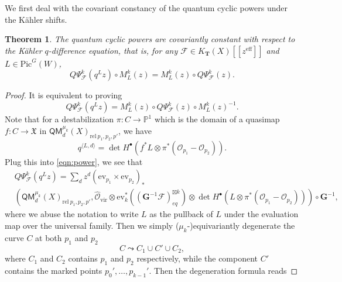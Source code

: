 \documentclass[reqno]{amsart}
\numberwithin{equation}{section}
\numberwithin{equation}{section}
\numberwithin{equation}{section}
\newtheorem{thm}{Theorem}[section]
\theoremstyle{definition}
\theoremstyle{remark}
\theoremstyle{remark}
\newcommand{\curly}{\mathrel{\leadsto}}
\begin{document}
We first deal with the covariant constancy of the quantum cyclic powers under the K\"ahler shifts.
\begin{thm}\label{thm:kahler-covariant-constancy}
    The quantum cyclic powers are covariantly constant with respect to the K\"ahler $q$-difference equation, that is, for any $\mathcal{F} \in K_{\mathbf{T}}(X)[\![ z^{\mathrm{eff}} ]\!]$ and $L \in \mathrm{Pic}^G(W)$,
    \begin{equation}
        Q\Psi^k_{\mathcal{F}}(q^L z) \circ M_L^k(z) = M^k_L(z) \circ Q\Psi^k_{\mathcal{F}}(z).
    \end{equation}
\end{thm}
\begin{proof}
    It is equivalent to proving
    \begin{equation}
        Q\Psi^k_{\mathcal{F}}(q^L z) = M^k_L(z) \circ Q\Psi^k_{\mathcal{F}}(z) \circ M_L^k(z)^{-1}.
    \end{equation}
    Note that for a destabilization $\pi: C \to \mathbb{P}^1$ which is the domain of a quasimap $f: C \to \mathfrak{X}$ in $\mathsf{QM}_d^{\mu_k}(X)_{\mathrm{rel} \  p_1,p_2, p'}$, we have
    \begin{equation}
        q^{\langle L,d \rangle} = \det H^{\bullet}(f^*L \otimes \pi^*(\mathcal{O}_{p_1} - \mathcal{O}_{p_2})).
    \end{equation}
    Plug this into \eqref{eqn:power}, we see that
    \begin{equation}
    \begin{aligned}
        &Q\Psi^k_{\mathcal{F}}(q^L z) = \sum_{d} z^d (\mathrm{ev}_{p_1} \times \mathrm{ev}_{p_2})_* \\
        &\left( \mathsf{QM}_d^{\mu_k}(X)_{\mathrm{rel} \  p_1,p_2, p'}, \hat{\mathcal{O}}_{\mathrm{vir}} \otimes \mathrm{ev}_k^* ((\mathbf{G}^{-1}\mathcal{F})^{\boxtimes k}_{eq}) \otimes \det H^{\bullet}(L \otimes \pi^*(\mathcal{O}_{p_1} - \mathcal{O}_{p_2})) \right) \circ \mathbf{G}^{-1},
    \end{aligned}
    \end{equation}
    where we abuse the notation to write $L$ as the pullback of $L$ under the evaluation map over the universal family. Then we simply ($\mu_k$-)equivariantly degenerate the curve $C$ at both $p_1$ and $p_2$
    \begin{equation}
        C \curly C_1 \cup C' \cup C_2,
    \end{equation}
    where $C_1$ and $C_2$ contains $p_1$ and $p_2$ respectively, while the component $C'$ contains the marked points $p_0', \dots, p_{k-1}'$. Then the degeneration formula reads

\end{proof}
\end{document}
